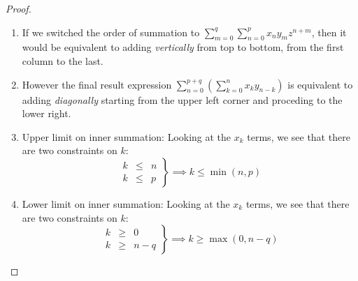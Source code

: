 {\begin{proof}
\begin{enumerate}
\begin{enumerate}
\item If we switched the order of summation to 
      $\sum_{m=0}^q \sum_{n=0}^p x_n y_m z^{n+m}$,
      then it would be equivalent to adding {\em vertically} 
      from top to bottom, 
      from the first column to the last.

\item However the final result expression
      $\sum_{n=0}^{p+q} \left(\sum_{k=0}^n x_k y_{n-k} \right)  $
      is equivalent to adding {\em diagonally} 
      starting from the upper left corner and proceding 
      to the lower right.

\item Upper limit on inner summation:
      Looking at the $x_k$ terms, we see that there are two constraints
      on $k$:
  \[\left.\begin{array}{lll}
    k &\le& n  \\
    k &\le& p
  \end{array}\right\}
  \implies
  k\le\min(n,p)\]

\item Lower limit on inner summation:
      Looking at the $x_k$ terms, we see that there are two constraints
      on $k$:
  \[\left.\begin{array}{lll}
    k &\ge& 0  \\
    k &\ge& n-q
  \end{array}\right\}
  \implies
  k\ge\max(0,n-q)\]
\end{enumerate}
\end{enumerate}
\end{proof}
}


